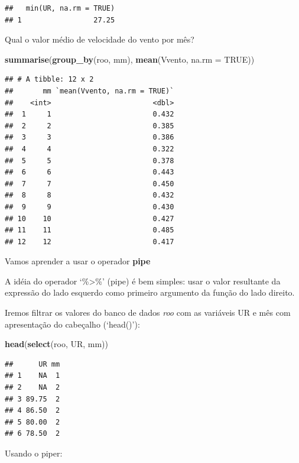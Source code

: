 \documentclass[
]{book}
\newenvironment{Shaded}{\begin{snugshade}}{\end{snugshade}}
\newcommand{\DataTypeTok}[1]{\textcolor[rgb]{0.13,0.29,0.53}{#1}}
\newcommand{\KeywordTok}[1]{\textcolor[rgb]{0.13,0.29,0.53}{\textbf{#1}}}
\newcommand{\NormalTok}[1]{#1}
\newcommand{\OtherTok}[1]{\textcolor[rgb]{0.56,0.35,0.01}{#1}}
\begin{document}
\begin{verbatim}
##   min(UR, na.rm = TRUE)
## 1                 27.25
\end{verbatim}

Qual o valor médio de velocidade do vento por mês?

\begin{Shaded}
\begin{Highlighting}[]
\KeywordTok{summarise}\NormalTok{(}\KeywordTok{group_by}\NormalTok{(roo, mm), }\KeywordTok{mean}\NormalTok{(Vvento, }\DataTypeTok{na.rm =} \OtherTok{TRUE}\NormalTok{))}
\end{Highlighting}
\end{Shaded}

\begin{verbatim}
## # A tibble: 12 x 2
##       mm `mean(Vvento, na.rm = TRUE)`
##    <int>                        <dbl>
##  1     1                        0.432
##  2     2                        0.385
##  3     3                        0.386
##  4     4                        0.322
##  5     5                        0.378
##  6     6                        0.443
##  7     7                        0.450
##  8     8                        0.432
##  9     9                        0.430
## 10    10                        0.427
## 11    11                        0.485
## 12    12                        0.417
\end{verbatim}

Vamos aprender a usar o operador \textbf{pipe}

A idéia do operador `\%\textgreater\%' (pipe) é bem simples: usar o valor resultante da expressão do lado esquerdo como primeiro argumento da função do lado direito.

Iremos filtrar os valores do banco de dados \emph{roo} com as variáveis UR e mês com apresentação do cabeçalho (`head()'):

\begin{Shaded}
\begin{Highlighting}[]
\KeywordTok{head}\NormalTok{(}\KeywordTok{select}\NormalTok{(roo, UR, mm))}
\end{Highlighting}
\end{Shaded}

\begin{verbatim}
##      UR mm
## 1    NA  1
## 2    NA  2
## 3 89.75  2
## 4 86.50  2
## 5 80.00  2
## 6 78.50  2
\end{verbatim}

Usando o piper:
\end{document}
